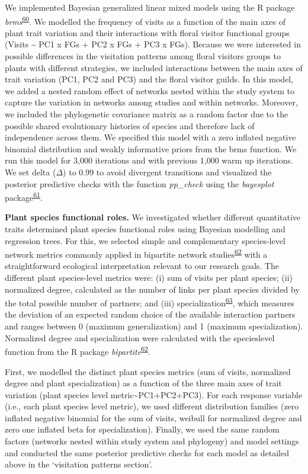 \documentclass[12pt,a4paper,]{article}
\begin{document}
We implemented Bayesian generalized linear mixed models using the R
package
\emph{brms}\textsuperscript{\protect\hyperlink{ref-burkner2017}{60}}. We
modelled the frequency of visits as a function of the main axes of plant
trait variation and their interactions with floral visitor functional
groups (Visits \textasciitilde{} PC1 x FGs + PC2 x FGs + PC3 x FGs).
Because we were interested in possible differences in the visitation
patterns among floral visitors groups to plants with different
strategies, we included interactions between the main axes of trait
variation (PC1, PC2 and PC3) and the floral visitor guilds. In this
model, we added a nested random effect of networks nested within the
study system to capture the variation in networks among studies and
within networks. Moreover, we included the phylogenetic covariance
matrix as a random factor due to the possible shared evolutionary
histories of species and therefore lack of independence across them. We
specified this model with a zero inflated negative binomial distribution
and weakly informative priors from the brms function. We run this model
for 3,000 iterations and with previous 1,000 warm up iterations. We set
delta (\(\Delta\)) to 0.99 to avoid divergent transitions and visualized
the posterior predictive checks with the function \emph{pp\_check} using
the \emph{bayesplot}
package\textsuperscript{\protect\hyperlink{ref-gabry2019}{61}}.

\textbf{Plant species functional roles.} We investigated whether
different quantitative traits determined plant species functional roles
using Bayesian modelling and regression trees. For this, we selected
simple and complementary species-level network metrics commonly applied
in bipartite network
studies\textsuperscript{\protect\hyperlink{ref-dormann2008}{62}} with a
straightforward ecological interpretation relevant to our research
goals. The different plant species-level metrics were: (i) sum of visits
per plant species; (ii) normalized degree, calculated as the number of
links per plant species divided by the total possible number of
partners; and (iii)
specialization\textsuperscript{\protect\hyperlink{ref-bluthgen2006}{63}},
which measures the deviation of an expected random choice of the
available interaction partners and ranges between 0 (maximum
generalization) and 1 (maximum specialization). Normalized degree and
specialization were calculated with the specieslevel function from the R
package
\emph{bipartite}\textsuperscript{\protect\hyperlink{ref-dormann2008}{62}}.

First, we modelled the distinct plant species metrics (sum of visits,
normalized degree and plant specialization) as a function of the three
main axes of trait variation (plant species level
metric\textasciitilde{}PC1+PC2+PC3). For each response variable (i.e.,
each plant species level metric), we used different distribution
families (zero inflated negative binomial for the sum of visits, weibull
for normalized degree and zero one inflated beta for specialization).
Finally, we used the same random factors (networks nested within study
system and phylogeny) and model settings and conducted the same
posterior predictive checks for each model as detailed above in the
`visitation patterns section'.
\end{document}
